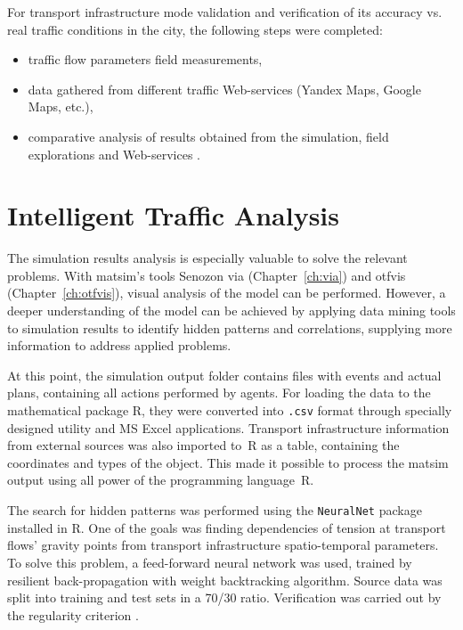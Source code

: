 For transport infrastructure mode validation and verification of its accuracy vs. real traffic conditions in the city, the following steps were completed: 
\begin{itemize}
\item traffic flow parameters field measurements,
\item data gathered from different traffic Web-services (Yandex Maps, Google Maps, etc.),
\item comparative analysis of results obtained from the simulation, field explorations and Web-services \citep[][]{SaprykinaEtAl_2014}.
\end{itemize}

\section{Intelligent Traffic Analysis}
 The simulation results analysis is especially valuable to solve the relevant problems. 
With \gls{matsim}'s tools Senozon \gls{via} (Chapter~\ref{ch:via}) and \gls{otfvis} (Chapter~\ref{ch:otfvis}), visual analysis of the model can be performed. 
However, a deeper understanding of the model can be achieved by applying data mining tools to simulation results to 
identify hidden patterns and correlations, supplying more information to address applied problems. 

At this point, the simulation output folder contains files with events and actual plans, containing all actions performed by agents. For loading the data to the mathematical package R, they were converted into \lstinline|.csv| format through specially designed utility and MS Excel applications. Transport infrastructure information from external sources was also imported to~R as a table, containing the coordinates and types of the object. This made it possible to process the \gls{matsim} output using all power of the programming language~R.

The search for hidden patterns was performed using the \lstinline|NeuralNet| package installed in R. One of the goals was finding dependencies of tension at transport flows' gravity points from transport infrastructure spatio-temporal parameters. To solve this problem, a feed-forward neural network was used, trained by resilient back-propagation with weight backtracking algorithm. Source data was split into training and test sets in a 70/30 ratio. Verification was carried out by the regularity criterion \citep[][]{MikheevaEtAl_2012}.

